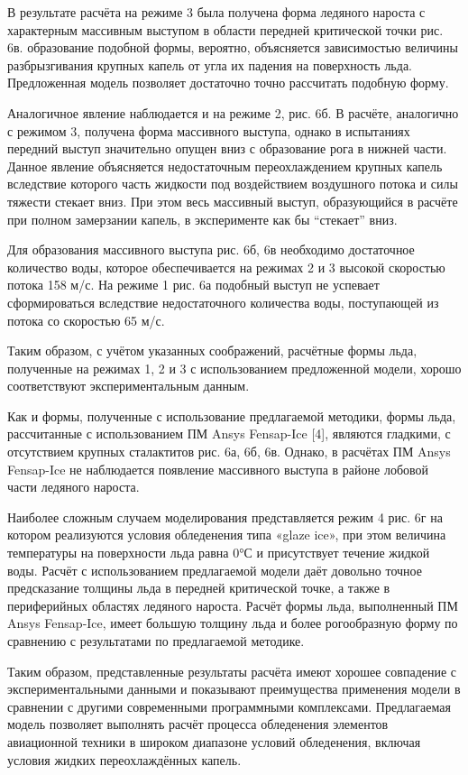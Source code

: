 \documentclass{psta}%
\begin{document}
В результате расчёта на режиме 3 была получена форма ледяного нароста с характерным массивным выступом в области передней критической точки рис. 6в. образование подобной формы, вероятно, объясняется зависимостью величины разбрызгивания крупных капель от угла их падения на поверхность льда.
Предложенная модель позволяет достаточно точно рассчитать подобную форму.

Аналогичное явление наблюдается и на режиме 2, рис. 6б. В расчёте, аналогично с режимом 3, получена форма массивного выступа, однако в испытаниях передний выступ значительно опущен вниз с образование рога в нижней части. Данное явление объясняется недостаточным переохлаждением крупных капель вследствие которого часть жидкости под воздействием воздушного потока и силы тяжести стекает вниз.
При этом весь массивный выступ, образующийся в расчёте при полном замерзании капель, в эксперименте как бы “стекает” вниз.
 
Для образования массивного выступа рис. 6б, 6в необходимо достаточное количество воды, которое обеспечивается на режимах 2 и 3 высокой скоростью потока 158 м/с. На режиме 1 рис. 6а подобный выступ не успевает сформироваться вследствие недостаточного количества воды, поступающей из потока со скоростью 65 м/с.

Таким образом, с учётом указанных соображений, расчётные формы льда, полученные на режимах 1, 2 и 3 с использованием предложенной модели, хорошо соответствуют экспериментальным данным. 

Как и формы, полученные с использование предлагаемой методики, формы льда, рассчитанные с использованием ПМ Ansys Fensap-Ice [4], являются гладкими, с отсутствием крупных сталактитов рис. 6а, 6б, 6в. Однако, в расчётах ПМ Ansys Fensap-Ice не наблюдается появление массивного выступа в районе лобовой части ледяного нароста.

Наиболее сложным случаем моделирования представляется режим 4 рис. 6г на котором реализуются условия обледенения типа «glaze ice», при этом величина температуры на поверхности льда равна 0°С и присутствует течение жидкой воды. Расчёт с использованием предлагаемой модели даёт довольно точное предсказание толщины льда в передней критической точке, а также в периферийных областях ледяного нароста. Расчёт формы льда, выполненный ПМ Ansys Fensap-Ice, имеет большую толщину льда и более рогообразную форму по сравнению с результатами по предлагаемой методике. 

Таким образом, представленные результаты расчёта имеют хорошее совпадение с экспериментальными данными и показывают преимущества применения модели в сравнении с другими современными программными комплексами. Предлагаемая модель позволяет выполнять расчёт процесса обледенения элементов авиационной техники в широком диапазоне условий обледенения, включая условия жидких переохлаждённых капель.
\end{document}

